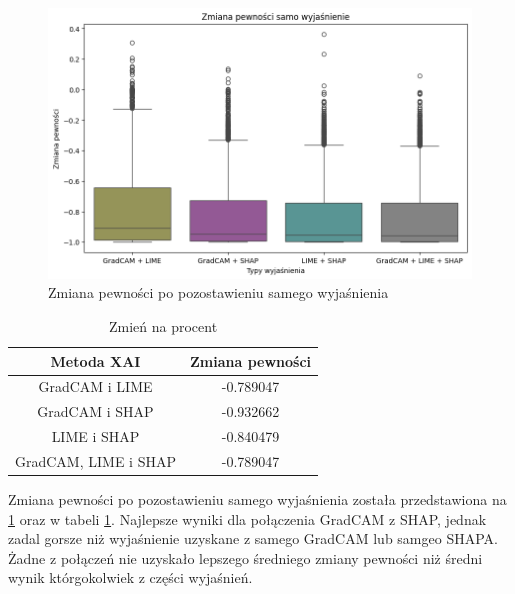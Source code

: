 \begin{figure}[h]
	\centering\includegraphics[width=.9\textwidth]{img/combine_confidence_exp_and}
	\caption{Zmiana pewności po pozostawieniu samego wyjaśnienia}  \label{rys:combineandconfidencean}
\end{figure}
\begin{table}[h]
	\centering
	\begin{tabular}{|c|c|}
		\hline
		\textbf{Metoda XAI}  & Zmiana pewności \\
		\hline
		GradCAM i LIME       & -0.789047       \\
		\hline
		GradCAM i SHAP       & -0.932662       \\
		\hline
		LIME i SHAP          & -0.840479       \\
		\hline
		GradCAM, LIME i SHAP & -0.789047       \\
		\hline
	\end{tabular}
	\caption{Zmień na procent}
	\label{tab:combineandconfidenceand}
\end{table}
Zmiana pewności po pozostawieniu samego wyjaśnienia została przedstawiona na \ref{rys:combineandconfidencean} oraz w tabeli \ref{tab:combineandconfidenceand}.
Najlepsze wyniki dla połączenia GradCAM z SHAP, jednak zadal gorsze niż wyjaśnienie uzyskane z samego GradCAM lub samgeo SHAPA.
Żadne z połączeń nie uzyskało lepszego średniego zmiany pewności niż średni wynik którgokolwiek z części wyjaśnień.

\vspace{1cm}

